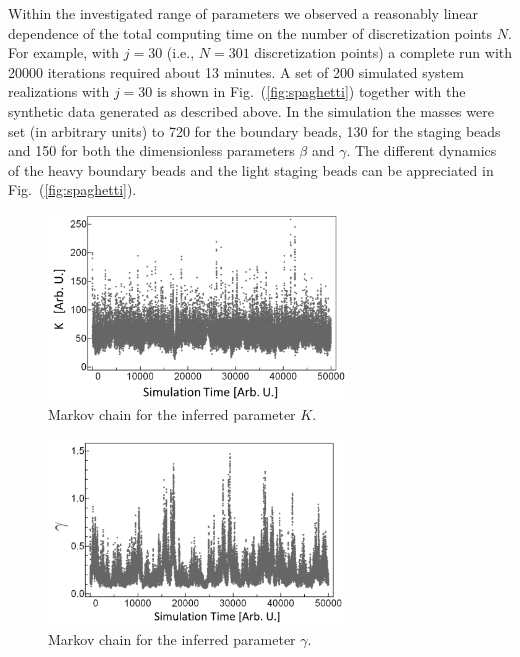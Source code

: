 \documentclass[12pt,a4paper,final]{iopart}
\begin{document}
Within the investigated range of parameters we observed a reasonably linear dependence of the total computing time on the number of discretization points $N$. For example, with $j=30$ (i.e., $N = 301$ discretization points) a complete run with 20000 iterations required about 13 minutes. A set of 200 simulated system realizations with $j=30$ is shown in Fig.~(\ref{fig:spaghetti}) together with the synthetic data generated as described above. In the simulation the masses were set (in arbitrary units) to 720 for the boundary beads, 130 for the staging beads and 150 for both the dimensionless parameters $\beta$ and $\gamma$. The different dynamics of the heavy boundary beads and the light staging beads can be appreciated in Fig.~(\ref{fig:spaghetti}).
%
\begin{figure}[htb!]
    \centering
    \includegraphics[width=0.7\textwidth]{Figs/FigChainK.png}
    \caption{Markov chain for the inferred parameter $K$.}
    \label{fig:chainK}
\end{figure}
%
\begin{figure}[htb!]
    \centering
    \includegraphics[width=0.7\textwidth]{Figs/FigChainG.png}
    \caption{Markov chain for the inferred parameter $\gamma$.}
    \label{fig:chainG}
\end{figure}
\end{document}
